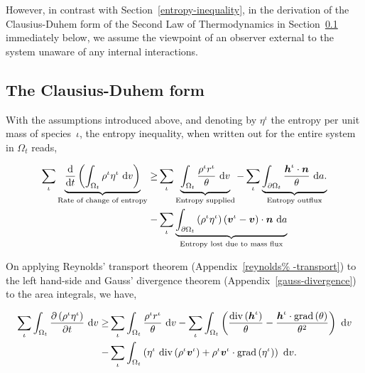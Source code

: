 \noindent However, in contrast with Section~\ref{entropy-inequality},
in the derivation of the Clausius-Duhem form of the Second Law of
Thermodynamics in Section~\ref{eu-clausius-duhem-form} immediately
below, we assume the viewpoint of an observer external to the system
unaware of any internal interactions.

\subsection{The Clausius-Duhem form}
\label{eu-clausius-duhem-form}

With the assumptions introduced above, and denoting by $\eta^\iota$
the entropy per unit mass of species~$\iota$, the entropy inequality,
when written out for the entire system in $\Omega_{t}$ reads,

\begin{equation}
\begin{split}
\sum\limits_{\iota}
\underbrace{\frac{\mathrm{d}}{\mathrm{d}t}\left(\int_{\Omega_{t}}
  \rho^{\iota} \eta^{\iota}\ \mathrm{d}v \right)}_{\text{Rate of
    change of entropy}} \geq & \sum\limits_{\iota}
\underbrace{\int_{\Omega_{t}} \frac{ \rho^{\iota}
    r^{\iota}}{\theta}\ \mathrm{d}v}_{\text{Entropy supplied}} -
\sum\limits_{\iota} \underbrace{\int_{\partial \Omega_{t}}
  \frac{\mbox{\boldmath$ h$}^{\iota}\cdot\mbox{\boldmath$ n$}}{\theta}\ \mathrm{d}a.}_{\text{Entropy
    outflux}} \\ - & \sum\limits_{\iota} \underbrace{\int_{\partial
    \Omega_{t}} \left(\rho^{\iota} \eta^{\iota} \right)
  \left(\mbox{\boldmath$ v$}^{\iota} - \mbox{\boldmath$ v$}\right) \cdot
  \mbox{\boldmath$ n$}\ \mathrm{d}a}_{\text{Entropy lost due to mass flux}}
\end{split}
\label{eu-globalbalanceofentropy}
\end{equation}

On applying Reynolds' transport theorem (Appendix~\ref{reynolds%
  -transport}) to the left hand-side and Gauss' divergence theorem
(Appendix~\ref{gauss-divergence}) to the area integrals, we have,

\begin{equation*}
\begin{split}
\sum\limits_{\iota} \int_{\Omega_{t}} \frac{\partial
  \left(\rho^{\iota} \eta^{\iota}\right) }{\partial t} \ \mathrm{d}v
\geq & \sum\limits_{\iota} \int_{\Omega_{t}} \frac{ \rho^{\iota}
  r^{\iota}}{\theta}\ \mathrm{d}v - \sum\limits_{\iota}
\int_{\Omega_{t}} \left(
\frac{\mathrm{div}\left(\mbox{\boldmath$ h$}^{\iota}\right)}{\theta} -
\frac{\mbox{\boldmath$ h$}^{\iota}\cdot\mathrm{grad}\left(\theta\right)}{\theta^{2}}
\right)\ \mathrm{d}v \\ - & \sum\limits_{\iota} \int_{\Omega_{t}}
\left( \eta^{\iota}\ \mathrm{div} \left(\rho^{\iota}\mbox{\boldmath$ v$}^{\iota}
\right) +
\rho^{\iota}\mbox{\boldmath$ v$}^{\iota}\cdot\mathrm{grad}\left(\eta^{\iota}\right)
\right)\ \mathrm{d}v.
\end{split}
\end{equation*}

